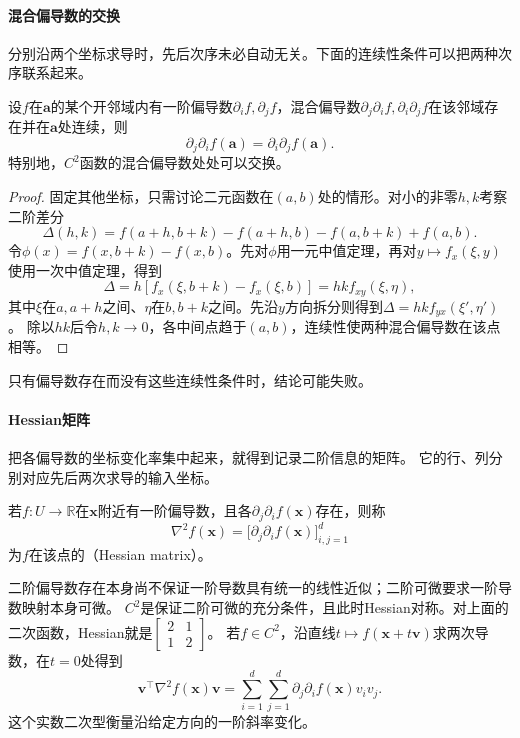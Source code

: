 \paragraph{混合偏导数的交换}
分别沿两个坐标求导时，先后次序未必自动无关。下面的连续性条件可以把两种次序联系起来。
\begin{theorem}[混合偏导数的交换]
\label{thm:multivariable-mixed-partials}
设$f$在$\bm a$的某个开邻域内有一阶偏导数$\partial_i f,\partial_j f$，混合偏导数$\partial_j\partial_i f,\partial_i\partial_j f$在该邻域存在并在$\bm a$处连续，则
\[
 \partial_j\partial_i f(\bm a)=\partial_i\partial_j f(\bm a).
\]
特别地，$C^2$函数的混合偏导数处处可以交换。
\end{theorem}
\begin{proof}
固定其他坐标，只需讨论二元函数在$(a,b)$处的情形。对小的非零$h,k$考察二阶差分
\[
 \Delta(h,k)=f(a+h,b+k)-f(a+h,b)-f(a,b+k)+f(a,b).
\]
令$\phi(x)=f(x,b+k)-f(x,b)$。先对$\phi$用一元中值定理，再对$y\mapsto f_x(\xi,y)$使用一次中值定理，得到
\[
 \Delta=h[f_x(\xi,b+k)-f_x(\xi,b)]=hk f_{xy}(\xi,\eta),
\]
其中$\xi$在$a,a+h$之间、$\eta$在$b,b+k$之间。先沿$y$方向拆分则得到$\Delta=hk f_{yx}(\xi',\eta')$。
除以$hk$后令$h,k\to0$，各中间点趋于$(a,b)$，连续性使两种混合偏导数在该点相等。
\end{proof}
只有偏导数存在而没有这些连续性条件时，结论可能失败。

\paragraph{Hessian矩阵}
把各偏导数的坐标变化率集中起来，就得到记录二阶信息的矩阵。
它的行、列分别对应先后两次求导的输入坐标。
\begin{definition}[Hessian矩阵]
\label{def:multivariable-hessian}
若$f:U\to\mathbb R$在$\bm x$附近有一阶偏导数，且各$\partial_j\partial_i f(\bm x)$存在，则称
\[
 \nabla^2f(\bm x)=\bigl[\partial_j\partial_i f(\bm x)\bigr]_{i,j=1}^d
\]
为$f$在该点的（Hessian matrix）。
\end{definition}
二阶偏导数存在本身尚不保证一阶导数具有统一的线性近似；二阶可微要求一阶导数映射本身可微。
$C^2$是保证二阶可微的充分条件，且此时Hessian对称。对上面的二次函数，Hessian就是$\begin{bmatrix}2&1\\1&2\end{bmatrix}$。
若$f\in C^2$，沿直线$t\mapsto f(\bm x+t\bm v)$求两次导数，在$t=0$处得到
\[
 \bm v^\top\nabla^2f(\bm x)\bm v
 =\sum_{i=1}^d\sum_{j=1}^d \partial_j\partial_i f(\bm x)v_i v_j.
\]
这个实数二次型衡量沿给定方向的一阶斜率变化。

